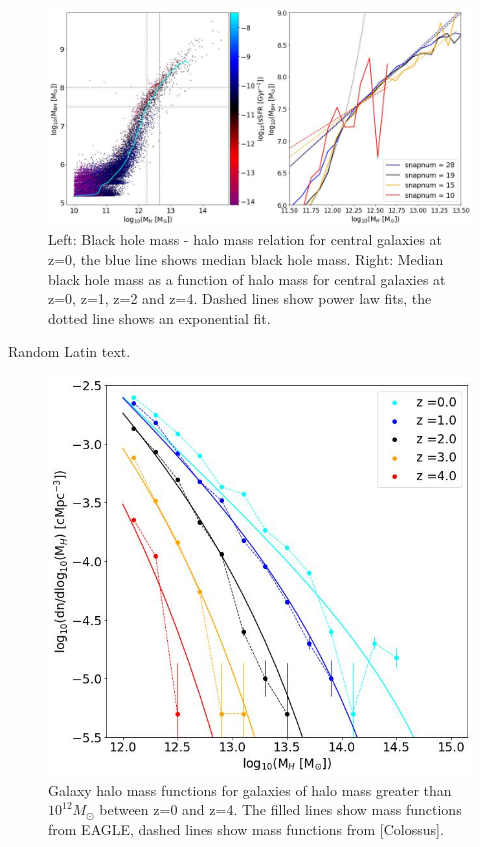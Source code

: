 \documentclass[12pt, twocolumn]{revtex4}    %
\begin{document}
\begin{figure}[H]
\centering
\includegraphics[width=17cm]{Plot_3.jpeg}
\caption{Left: Black hole mass - halo mass relation for central galaxies at z=0, the blue line shows median black hole mass. Right: Median black hole mass as a function of halo mass for central galaxies at z=0, z=1, z=2 and z=4. Dashed lines show power law fits, the dotted line shows an exponential fit.}
\label{fig:3}
\end{figure}
\twocolumngrid


Random Latin text.

\onecolumngrid


\begin{figure}[H]
\centering
\includegraphics[width=\linewidth]{Mass_Function.jpeg}
\caption{Galaxy halo mass functions for galaxies of halo mass greater than $10^{12}M_\odot$ between z=0 and z=4. The filled lines show mass functions from EAGLE, dashed lines show mass functions from [Colossus].}
\label{fig:4}
\end{figure}
\twocolumngrid
\end{document}
